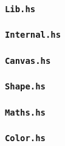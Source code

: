 \documentclass[../main.tex]{subfiles}
\begin{document}
        \subsubsection*{\texttt{Lib.hs}}
            
        \subsubsection*{\texttt{Internal.hs}}
            
        \subsubsection*{\texttt{Canvas.hs}}
            
        \subsubsection*{\texttt{Shape.hs}}
            
        \subsubsection*{\texttt{Maths.hs}}
            
        \subsubsection*{\texttt{Color.hs}}
            
\end{document}
